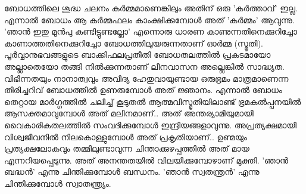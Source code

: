 ബോധത്തിലെ ശുദ്ധ ചലനം കര്‍മ്മമാണെങ്കിലും അതിന്‌ ഒരു 'കര്‍ത്താവ്‌' ഇല്ല. എന്നാല്‍ ബോധം ആ കര്‍മ്മഫലം കാംക്ഷിക്കുമ്പോള്‍ അത്‌ 'കര്‍മ്മം' ആവുന്നു. 'ഞാന്‍ ഇതു മുന്‍പു കണ്ടിട്ടുണ്ടല്ലോ' എന്നൊരു ധാരണ കാണുന്നതിനെക്കുറിച്ചോ കാണാത്തതിനെക്കുറിച്ചോ ബോധത്തിലുയരുന്നതാണ്‌ ഓര്‍മ്മ (സ്മൃതി). പൂര്‍വ്വാനുഭവങ്ങളുടെ ബാക്കിഫലപ്രതീതി ബോധതലത്തില്‍ പ്രകടമായോ അല്ലാതെയോ തങ്ങി നില്‍ക്കുന്നതാണ്‌ ലീനവാസന അല്ലെങ്കില്‍ സാദ്ധ്യത. വിഭിന്നതയും നാനാത്വവും അവിദ്യ ഹേതുവായുണ്ടായ ഒരുഭ്രമം മാത്രമാണെന്ന തിരിച്ചറിവ്‌ ബോധത്തില്‍ ഉണരുമ്പോള്‍ അത്‌ ജ്ഞാനം. എന്നാല്‍ ബോധം തെറ്റായ മാര്‍ഗ്ഗത്തില്‍ ചലിച്ച്‌ കൂടുതല്‍ ആത്മവിസ്മൃതിയിലാണ്ട്‌ ഭ്രമകല്‍പ്പനയില്‍ ആസക്തമാവുമ്പോള്‍ അത്‌ മലിനമാണ്‌.. അത്‌ അന്തര്യാമിയുമായി വൈകാരികതലത്തില്‍  സംവദിക്കുമ്പോള്‍ ഇന്ദ്രിയങ്ങളാവുന്നു. അപ്രത്യക്ഷമായി വിശ്വജീവനില്‍ നിലകൊള്ളുമ്പോള്‍ അത്‌ പ്രകൃതിയാണ്‌.. ഉണ്മയും പ്രത്യക്ഷലോകവും തമ്മിലുണ്ടാവുന്ന ചിന്താക്കുഴപ്പത്തില്‍ അത്‌ മായ എന്നറിയപ്പെടുന്നു. അത്‌ അനന്തതയില്‍ വിലയിക്കുമ്പോഴാണ്‌ മുക്തി. 'ഞാന്‍ ബദ്ധന്‍' എന്നു ചിന്തിക്കുമ്പോള്‍ ബന്ധനം. 'ഞാന്‍ സ്വതന്ത്രന്‍' എന്നു ചിന്തിക്കുമ്പോള്‍ സ്വാതന്ത്ര്യം. 

